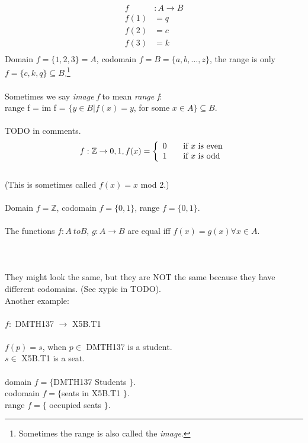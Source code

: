 \begin{align}
  f & : A \to B \nonumber \\
  f(1) & = q \nonumber \\
  f(2) & = c \nonumber \\
  f(3) & = k \nonumber \\
\end{align}
Domain $f = \{1, 2, 3\} = A$, codomain $f = B = \{a,b,\ldots,z\}$, the range is only
$f = \{c, k, q\} \subseteq B$.\footnote{Sometimes the range is also called the \emph{image}.} \\
\\
Sometimes we say \emph{image f} to mean \emph{range f}: \\
range f = im f = $\{y \in B | f(x) = y$, for some $x \in A\} \subseteq B$. \\
\\
TODO in comments.\\
\begin{align}
  f: \mathbb{Z} \to {0,1}, f(x) =
    \left\{
      \begin{array}{l l}
        0 & \quad \text{if $x$ is even} \\
        1 & \quad \text{if $x$ is odd} \\
      \end{array}
    \right.
\end{align}
\\
(This is sometimes called $f(x) = x$ mod $2$.)\\
\\
Domain $f = \mathbb{Z}$, codomain $f = \{0,1\}$, range $f = \{0,1\}$.\\
\\
The functions $f: A\ to B$, $g: A \to B$ are equal iff $f(x) = g(x) \forall x \in A$.\\
\\
\\
\\
They might look the same, but they are NOT the same because they have different codomains.
(See xypic in TODO).
\\
Another example: \\
\\
$f:$ DMTH137 $\to$ X5B.T1 \\
\\
$f(p) = s$, when $p \in $ DMTH137 is a student. \\
$s \in $ X5B.T1 is a seat. \\
\\
domain $f = \{$DMTH137 Students $\}$. \\
codomain $f = \{$seats in X5B.T1 $\}$. \\
range $f = \{$ occupied seats $\}$. \\

